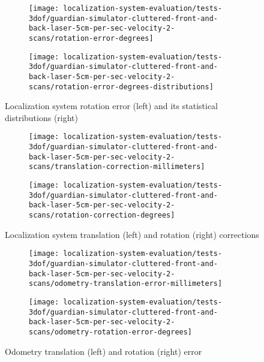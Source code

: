 \begin{figure}[H]
	\centering
	\begin{subfigure}[h]{0.47\textwidth}
		\centering
		\texttt{[image: localization-system-evaluation/tests-3dof/guardian-simulator-cluttered-front-and-back-laser-5cm-per-sec-velocity-2-scans/rotation-error-degrees]}
	\end{subfigure}
	\begin{subfigure}[h]{0.47\textwidth}
		\centering
		\texttt{[image: localization-system-evaluation/tests-3dof/guardian-simulator-cluttered-front-and-back-laser-5cm-per-sec-velocity-2-scans/rotation-error-degrees-distributions]}
	\end{subfigure}
	\caption{Localization system rotation error (left) and its statistical distributions (right)}
	\label{fig:localization-system-evaluation_guardian-simulator-cluttered-front-and-back-laser-5cm-per-sec-velocity-2-scans_rotation-errors}
\end{figure}

\begin{figure}[ht]
	\centering
	\begin{subfigure}[h]{0.47\textwidth}
		\centering
		\texttt{[image: localization-system-evaluation/tests-3dof/guardian-simulator-cluttered-front-and-back-laser-5cm-per-sec-velocity-2-scans/translation-correction-millimeters]}
	\end{subfigure}
	\begin{subfigure}[h]{0.47\textwidth}
		\centering
		\texttt{[image: localization-system-evaluation/tests-3dof/guardian-simulator-cluttered-front-and-back-laser-5cm-per-sec-velocity-2-scans/rotation-correction-degrees]}
	\end{subfigure}
	\caption{Localization system translation (left) and rotation (right) corrections}
	\label{fig:localization-system-evaluation_guardian-simulator-cluttered-front-and-back-laser-5cm-per-sec-velocity-2-scans_translation-rotation-corrections}
\end{figure}

\begin{figure}[ht]
	\centering
	\begin{subfigure}[h]{0.47\textwidth}
		\centering
		\texttt{[image: localization-system-evaluation/tests-3dof/guardian-simulator-cluttered-front-and-back-laser-5cm-per-sec-velocity-2-scans/odometry-translation-error-millimeters]}
	\end{subfigure}
	\begin{subfigure}[h]{0.47\textwidth}
		\centering
		\texttt{[image: localization-system-evaluation/tests-3dof/guardian-simulator-cluttered-front-and-back-laser-5cm-per-sec-velocity-2-scans/odometry-rotation-error-degrees]}
	\end{subfigure}
	\caption{Odometry translation (left) and rotation (right) error}
	\label{fig:localization-system-evaluation_guardian-simulator-cluttered-front-and-back-laser-5cm-per-sec-velocity-2-scans_odometry-translation-rotation-errors}
\end{figure}

